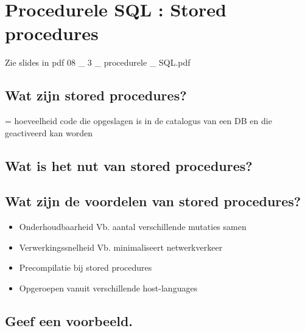 \newpage

\section{Procedurele SQL : Stored procedures}

Zie slides in pdf 08 \_ 3 \_ procedurele \_ SQL.pdf

\subsection{Wat zijn stored procedures?}

= hoeveelheid code die opgeslagen is in de catalogus van een DB en die geactiveerd kan worden
\subsection{Wat is het nut van stored procedures?}

\subsection{Wat zijn de voordelen van stored procedures?}

\begin{itemize}
\item Onderhoudbaarheid Vb. aantal verschillende mutaties samen
\item Verwerkingssnelheid Vb. minimaliseert netwerkverkeer
\item Precompilatie bij stored procedures
\item Opgeroepen vanuit verschillende host-languages
\end{itemize}

\subsection{Geef een voorbeeld.}